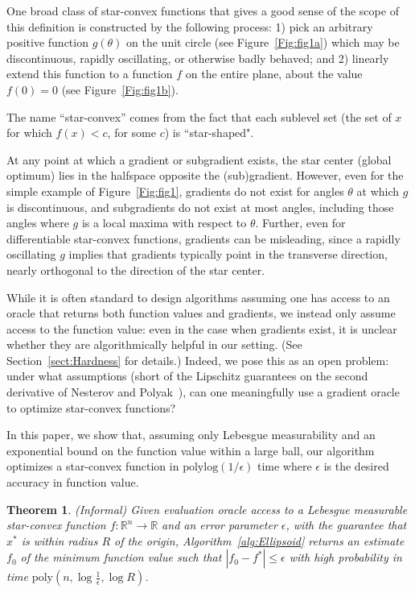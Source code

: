 \documentclass[11pt,letter]{article}
\renewcommand{\poly}{\mathrm{poly}}
\renewcommand{\polylog}{\mathrm{polylog}}
\newcommand{\Real}{\mathbb{R}}
\newcommand{\ferr}{\epsilon}
\newcounter{nTheorems}
\numberwithin{nTheorems}{section}
\newtheorem{theorem}[nTheorems]{Theorem}
\begin{document}
One broad class of star-convex functions that gives a good sense of the scope of this definition is constructed by the following process: 1) pick an arbitrary positive function $g(\theta)$ on the unit circle (see Figure~\ref{Fig:fig1a}) which may be discontinuous, rapidly oscillating, or otherwise badly behaved; and 2) linearly extend this function to a function $f$ on the entire plane, about the value $f(0)=0$ (see Figure~\ref{Fig:fig1b}).

The name ``star-convex'' comes from the fact that each sublevel set (the set of $x$ for which $f(x)<c$, for some $c$) is ``star-shaped".

At any point at which a gradient or subgradient exists, the star center (global optimum) lies in the halfspace opposite the (sub)gradient. However, even for the simple example of Figure~\ref{Fig:fig1}, gradients do not exist for angles $\theta$ at which $g$ is discontinuous, and subgradients do not exist at most angles, including those angles where $g$ is a local maxima with respect to $\theta$. Further, even for differentiable star-convex functions, gradients can be misleading, since a rapidly oscillating $g$ implies that gradients typically point in the transverse direction, nearly orthogonal to the direction of the star center.

While it is often standard to design algorithms assuming one has access to an oracle that returns both function values and gradients, we instead only assume access to the function value: even in the case when gradients exist, it is unclear whether they are algorithmically helpful in our setting. (See Section~\ref{sect:Hardness} for details.) Indeed, we pose this as an open problem: under what assumptions (short of the Lipschitz guarantees on the second derivative of Nesterov and Polyak~\cite{Nesterov:2006}), can one meaningfully use a gradient oracle to optimize star-convex functions?

In this paper, we show that, assuming only Lebesgue measurability and an exponential bound on the function value within a large ball, our algorithm optimizes a star-convex function in $\polylog(1/\ferr)$ time where $\ferr$ is the desired accuracy in function value.

\begin{theorem}
\label{thm:InformalIntro} (Informal)
Given evaluation oracle access to a Lebesgue measurable star-convex function $f : \Real^n \to \Real$ and an error parameter $\ferr$, with the guarantee that $x^\ast$ is within radius $R$ of the origin, Algorithm~\ref{alg:Ellipsoid} returns an estimate $f_0$ of the minimum function value such that $|f_0 - f^\ast| \le \ferr$ with high probability in time $\poly(n, \log \frac{1}{\ferr}, \log R)$.
\end{theorem}
\end{document}
